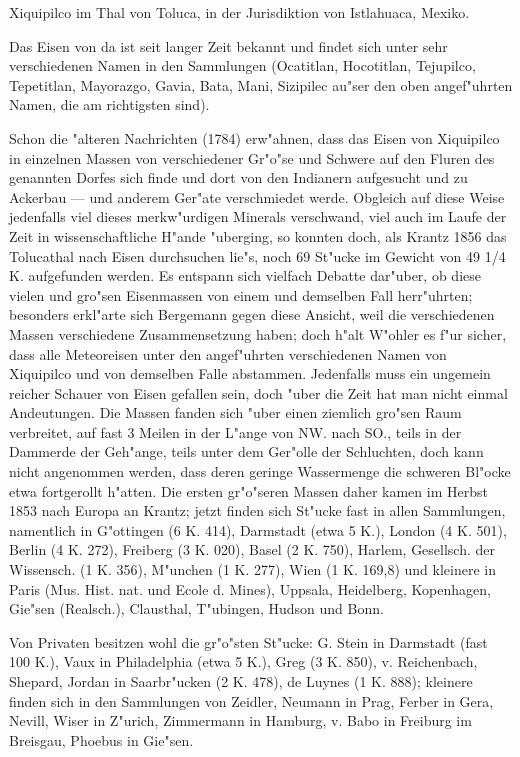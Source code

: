 \documentclass[a4paper, 11pt, oneside]{article}
\begin{document}
Xiquipilco im Thal von Toluca, in der Jurisdiktion von Istlahuaca, Mexiko.

Das Eisen von da ist seit langer Zeit bekannt und findet sich unter sehr verschiedenen Namen in den Sammlungen (Ocatitlan, Hocotitlan, Tejupilco, Tepetitlan, Mayorazgo, Gavia, Bata, Mani, Sizipilec au"ser den oben angef"uhrten Namen, die am richtigsten sind).

Schon die "alteren Nachrichten (1784) erw"ahnen, dass das Eisen von Xiquipilco in einzelnen Massen von verschiedener Gr"o"se und Schwere auf den Fluren des genannten Dorfes sich finde und dort von den Indianern aufgesucht und zu Ackerbau --- und anderem Ger"ate verschmiedet werde. Obgleich auf diese Weise jedenfalls viel dieses merkw"urdigen Minerals verschwand, viel auch im Laufe der Zeit in wissenschaftliche H"ande "uberging, so konnten doch, als Krantz 1856 das Tolucathal nach Eisen durchsuchen lie"s, noch 69 St"ucke im Gewicht von 49 1/4 K. aufgefunden werden. Es entspann sich vielfach Debatte dar"uber, ob diese vielen und gro"sen Eisenmassen von einem und demselben Fall herr"uhrten; besonders erkl"arte sich Bergemann gegen diese Ansicht, weil die verschiedenen Massen verschiedene Zusammensetzung haben; doch h"alt W"ohler es f"ur sicher, dass alle Meteoreisen unter den angef"uhrten verschiedenen Namen von Xiquipilco und von demselben Falle abstammen. Jedenfalls muss ein ungemein reicher Schauer von Eisen gefallen sein, doch "uber die Zeit hat man nicht einmal Andeutungen. Die Massen fanden sich "uber einen ziemlich gro"sen Raum verbreitet, auf fast 3 Meilen in der L"ange von NW. nach SO., teils in der Dammerde der Geh"ange, teils unter dem Ger"olle der Schluchten, doch kann nicht angenommen werden, dass deren geringe Wassermenge die schweren Bl"ocke etwa fortgerollt h"atten. Die ersten gr"o"seren Massen daher kamen im Herbst 1853 nach Europa an Krantz; jetzt finden sich St"ucke fast in allen Sammlungen, namentlich in G"ottingen (6 K. 414), Darmstadt (etwa 5 K.), London (4 K. 501), Berlin (4 K. 272), Freiberg (3 K. 020), Basel (2 K. 750), Harlem, Gesellsch. der Wissensch. (1 K. 356), M"unchen (1 K. 277), Wien (1 K. 169,8) und kleinere in Paris (Mus. Hist. nat. und Ecole d. Mines), Uppsala, Heidelberg, Kopenhagen, Gie"sen (Realsch.), Clausthal, T"ubingen, Hudson und Bonn.

Von Privaten besitzen wohl die gr"o"sten St"ucke: G. Stein in Darmstadt (fast 100 K.), Vaux in Philadelphia (etwa 5 K.), Greg (3 K. 850), v. Reichenbach, Shepard, Jordan in Saarbr"ucken (2 K. 478), de Luynes (1 K. 888); kleinere finden sich in den Sammlungen von Zeidler, Neumann in Prag, Ferber in Gera, Nevill, Wiser in Z"urich, Zimmermann in Hamburg, v. Babo in Freiburg im Breisgau, Phoebus in Gie"sen.
\end{document}
